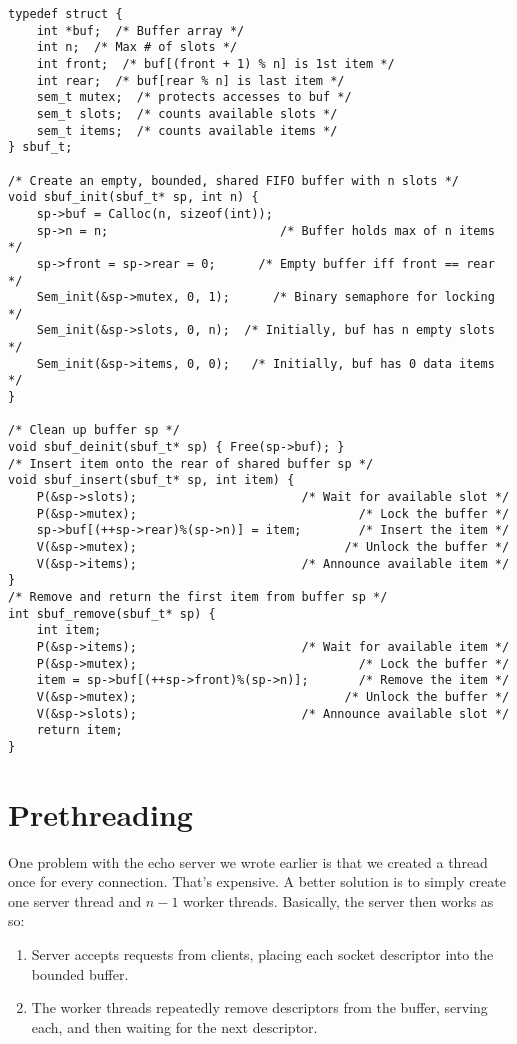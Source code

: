 \documentclass[fleqn]{article}
\begin{document}
\begin{verbatim}
typedef struct {
    int *buf;  /* Buffer array */
    int n;  /* Max # of slots */
    int front;  /* buf[(front + 1) % n] is 1st item */
    int rear;  /* buf[rear % n] is last item */
    sem_t mutex;  /* protects accesses to buf */
    sem_t slots;  /* counts available slots */
    sem_t items;  /* counts available items */
} sbuf_t;

/* Create an empty, bounded, shared FIFO buffer with n slots */
void sbuf_init(sbuf_t* sp, int n) {
    sp->buf = Calloc(n, sizeof(int)); 
    sp->n = n;                        /* Buffer holds max of n items */
    sp->front = sp->rear = 0;      /* Empty buffer iff front == rear */
    Sem_init(&sp->mutex, 0, 1);      /* Binary semaphore for locking */
    Sem_init(&sp->slots, 0, n);  /* Initially, buf has n empty slots */
    Sem_init(&sp->items, 0, 0);   /* Initially, buf has 0 data items */
}

/* Clean up buffer sp */
void sbuf_deinit(sbuf_t* sp) { Free(sp->buf); }
/* Insert item onto the rear of shared buffer sp */
void sbuf_insert(sbuf_t* sp, int item) {
    P(&sp->slots);                       /* Wait for available slot */
    P(&sp->mutex);                               /* Lock the buffer */
    sp->buf[(++sp->rear)%(sp->n)] = item;        /* Insert the item */
    V(&sp->mutex);                             /* Unlock the buffer */
    V(&sp->items);                       /* Announce available item */
}
/* Remove and return the first item from buffer sp */
int sbuf_remove(sbuf_t* sp) {
    int item;
    P(&sp->items);                       /* Wait for available item */
    P(&sp->mutex);                               /* Lock the buffer */
    item = sp->buf[(++sp->front)%(sp->n)];       /* Remove the item */
    V(&sp->mutex);                             /* Unlock the buffer */
    V(&sp->slots);                       /* Announce available slot */
    return item;
}
\end{verbatim}

\section{Prethreading}

One problem with the echo server we wrote earlier is that we created a thread once for every connection. That's expensive. A better solution is to simply create one server thread and $n - 1$ worker threads. Basically, the server then works as so:

\begin{enumerate}
\item Server accepts requests from clients, placing each socket descriptor into the bounded buffer.

\item The worker threads repeatedly remove descriptors from the buffer, serving each, and then waiting for the next descriptor.
\end{enumerate}
\end{document}
